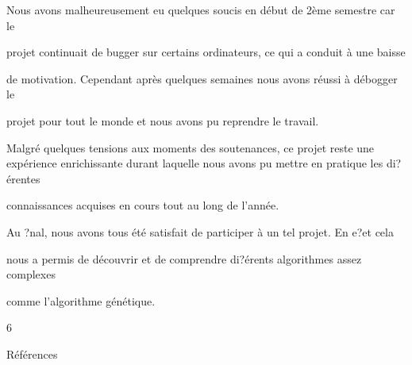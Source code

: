 \documentclass[a4paper,portrait,12pt]{article}
\begin{document}
\begin{flushleft}
Nous avons malheureusement eu quelques soucis en d\'{e}but de 2\`{e}me semestre car le
\end{flushleft}


\begin{flushleft}
projet continuait de bugger sur certains ordinateurs, ce qui a conduit \`{a} une baisse
\end{flushleft}


\begin{flushleft}
de motivation. Cependant apr\`{e}s quelques semaines nous avons r\'{e}ussi \`{a} d\'{e}bogger le
\end{flushleft}


\begin{flushleft}
projet pour tout le monde et nous avons pu reprendre le travail.
\end{flushleft}


\begin{flushleft}
Malgr\'{e} quelques tensions aux moments des soutenances, ce projet reste une exp\'{e}rience enrichissante durant laquelle nous avons pu mettre en pratique les di?\'{e}rentes
\end{flushleft}


\begin{flushleft}
connaissances acquises en cours tout au long de l'ann\'{e}e.
\end{flushleft}


\begin{flushleft}
Au ?nal, nous avons tous \'{e}t\'{e} satisfait de participer \`{a} un tel projet. En e?et cela
\end{flushleft}


\begin{flushleft}
nous a permis de d\'{e}couvrir et de comprendre di?\'{e}rents algorithmes assez complexes
\end{flushleft}


\begin{flushleft}
comme l'algorithme g\'{e}n\'{e}tique.
\end{flushleft}





6





\begin{flushleft}
R\'{e}f\'{e}rences
\end{flushleft}
\end{document}
